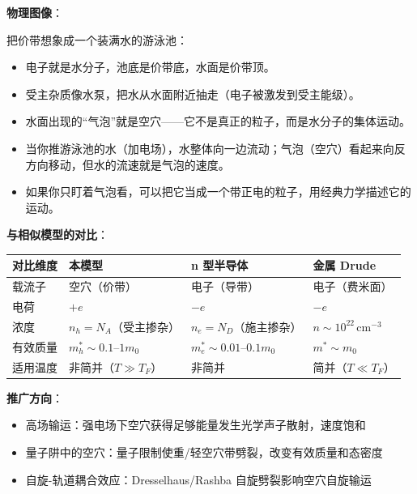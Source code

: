 \begin{insightbox}[物理图像与模型关联]
\textbf{物理图像}：

把价带想象成一个装满水的游泳池：
\begin{itemize}[nosep]
    \item 电子就是水分子，池底是价带底，水面是价带顶。
    \item 受主杂质像水泵，把水从水面附近抽走（电子被激发到受主能级）。
    \item 水面出现的``气泡''就是空穴——它不是真正的粒子，而是水分子的集体运动。
    \item 当你推游泳池的水（加电场），水整体向一边流动；气泡（空穴）看起来向反方向移动，但水的流速就是气泡的速度。
    \item 如果你只盯着气泡看，可以把它当成一个带正电的粒子，用经典力学描述它的运动。
\end{itemize}

\textbf{与相似模型的对比}：
\begin{center}
\begin{tabular}{llll}
\toprule
\textbf{对比维度} & \textbf{本模型} & \textbf{n 型半导体} & \textbf{金属 Drude} \\
\midrule
载流子 & 空穴（价带） & 电子（导带） & 电子（费米面） \\
电荷 & $+e$ & $-e$ & $-e$ \\
浓度 & $n_h=N_A$（受主掺杂） & $n_e=N_D$（施主掺杂） & $n\sim10^{22}\,$cm$^{-3}$ \\
有效质量 & $m_h^*\sim0.1$--$1m_0$ & $m_e^*\sim0.01$--$0.1m_0$ & $m^*\sim m_0$ \\
适用温度 & 非简并（$T\gg T_F$） & 非简并 & 简并（$T\ll T_F$） \\
\bottomrule
\end{tabular}
\end{center}

\textbf{推广方向}：
\begin{itemize}[nosep]
    \item 高场输运：强电场下空穴获得足够能量发生光学声子散射，速度饱和
    \item 量子阱中的空穴：量子限制使重/轻空穴带劈裂，改变有效质量和态密度
    \item 自旋-轨道耦合效应：Dresselhaus/Rashba 自旋劈裂影响空穴自旋输运
\end{itemize}
\end{insightbox}

